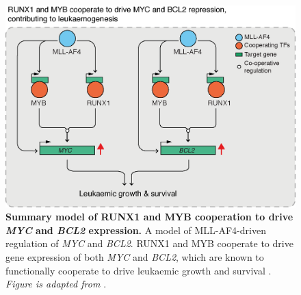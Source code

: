 \begin{figure}[htbp]
    \centering
    \includegraphics[width=\textwidth,keepaspectratio]{figures/models/ch4_model-ma4-myc-bcl2.png}
    \caption[{Summary model of RUNX1 and MYB cooperation to drive \textit{MYC} and \textit{BCL2} expression.}]
    {\textbf{Summary model of RUNX1 and MYB cooperation to drive \textit{MYC} and \textit{BCL2} expression.}
    A model of MLL-AF4-driven regulation of \textit{MYC} and \textit{BCL2}. RUNX1 and MYB cooperate to drive gene expression of both \textit{MYC} and \textit{BCL2}, which are known to functionally cooperate to drive leukaemic growth and survival \citep{fanidi_cooperative_1992, bissonnette_apoptotic_1992}. 
    \textit{Figure is adapted from \cite{harman_kmt2a-aff1_2021}}. 
    }
    \label{fig:ch4_model-ma4-myc-bcl2}
\end{figure}

